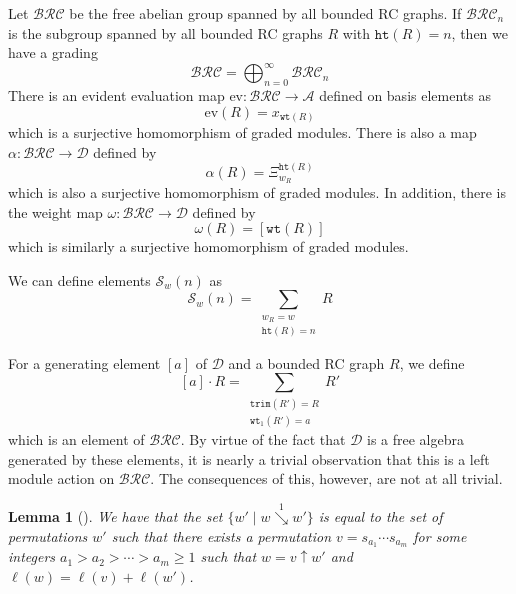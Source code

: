 \documentclass{amsart}
\newtheorem{lemma}{Lemma}[subsection]
\theoremstyle{definition}
\theoremstyle{remark}
\numberwithin{equation}{subsection}
\newcommand{\shup}{{\uparrow}}
\newcommand{\downvar}[1]{\stackrel{#1}{\searrow}}
\newcommand{\wof}[1]{w_{#1}}
\newcommand{\wtt}{\mathtt{wt}}
\newcommand{\trm}{\mathtt{trim}}
\newcommand{\hr}{\mathtt{ht}}
\newcommand{\BRC}{\mathcal{BRC}}
\newcommand{\dsch}{\ensuremath{\Xi}}
\newcommand{\coma}{\mathcal{A}}
\newcommand{\dcoma}{\mathcal{D}}
\begin{document}
Let $\BRC$ be the free abelian group spanned by all bounded RC graphs. If $\BRC_n$ is the subgroup spanned by all bounded RC graphs $R$ with $\hr(R)=n$, then we have a grading
$$\BRC = \bigoplus_{n=0}^\infty \BRC_n$$
There is an evident evaluation map $\mathrm{ev}: \BRC\to \coma$ defined on basis elements as
$$\mathrm{ev}(R) = x_{\wtt(R)}$$
which is a surjective homomorphism of graded modules. There is also a map $\alpha:\BRC\to\dcoma$ defined by
$$\alpha(R) = \dsch_{\wof{R}}^{\hr(R)}$$
which is also a surjective homomorphism of graded modules. In addition, there is the weight map $\omega:\BRC\to \dcoma$ defined by
$$\omega(R) = [\wtt(R)]$$
which is similarly a surjective homomorphism of graded modules.

We can define elements $\mathcal{S}_w(n)$ as
$$\mathcal{S}_w(n) = \sum_{\substack{\wof{R}=w\\\hr(R)=n}}R$$

For a generating element $[a]$ of $\dcoma$ and a bounded RC graph $R$, we define 
$$[a]\cdot R=\sum_{\substack{\trm(R') = R\\\wtt_1(R') = a}}R'$$
which is an element of $\BRC$. By virtue of the fact that $\dcoma$ is a free algebra generated by these elements, it is nearly a trivial observation that this is a left module action on $\BRC$. The consequences of this, however, are not at all trivial.

\begin{lemma}[{\cite[Corollary~3.11]{bbrc}}] \label{lemma:d1desc}
We have that the set $\{w'\mid w\downvar{1} w'\}$ is equal to the set of permutations $w'$ such that there exists a permutation $v=s_{a_1}\cdots s_{a_m}$ for some integers $a_1>a_2>\cdots>a_m\geq 1$ such that $w =v\shup{w'}$ and $\ell(w)=\ell(v)+\ell(w')$.
\end{lemma}
\end{document}
